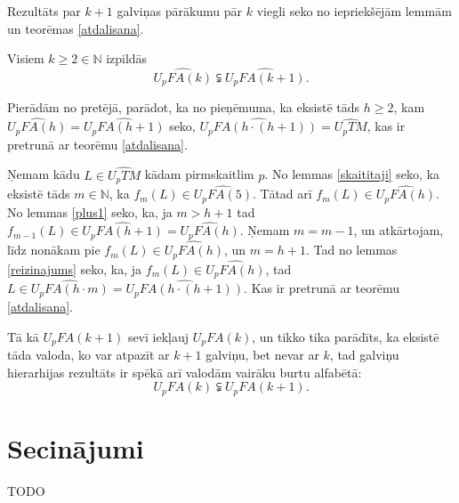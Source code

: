 \documentclass{ludis}
\begin{document}
Rezultāts par $k + 1$ galviņas pārākumu pār $k$ viegli seko no iepriekšējām lemmām un teorēmas \ref{atdalisana}.
\begin{teorema}
Visiem $k \geq 2 \in \mathbb{N}$ izpildās
\[
	\widehat{U_pFA(k)} \subsetneqq \widehat{U_pFA(k + 1)}.
\]
\end{teorema}
\begin{pieradijums}
Pierādām no pretējā, parādot, ka no pieņēmuma, ka eksistē tāds $h \geq 2$, kam $\widehat{U_pFA(h)} = \widehat{U_pFA(h + 1)}$ seko, $\widehat{U_pFA(h \cdot (h + 1))} = \widehat{U_pTM}$, kas ir pretrunā ar teorēmu \ref{atdalisana}.

Ņemam kādu $L \in \widehat{U_pTM}$ kādam pirmskaitlim $p$. No lemmas \ref{skaititaji} seko, ka eksistē tāds $m \in \mathbb{N}$, ka $f_m(L) \in \widehat{U_pFA(5)}$. Tātad arī $f_m(L) \in \widehat{U_pFA(h)}$. No lemmas \ref{plus1} seko, ka, ja $m > h + 1$ tad $f_{m-1}(L) \in \widehat{U_pFA(h + 1)} = \widehat{U_pFA(h)}$. Ņemam $m = m - 1$, un atkārtojam, līdz nonākam pie $f_m(L) \in \widehat{U_pFA(h)}$, un $m = h + 1$. Tad no lemmas \ref{reizinajums} seko, ka, ja $f_m(L) \in \widehat{U_pFA(h)}$, tad $L \in \widehat{U_pFA(h \cdot m)} = \widehat{U_pFA(h \cdot (h + 1))}$. Kas ir pretrunā ar teorēmu \ref{atdalisana}.
\end{pieradijums}
\begin{sekas}
Tā kā $U_pFA(k + 1)$ sevī iekļauj $U_pFA(k)$, un tikko tika parādīts, ka eksistē tāda valoda, ko var atpazīt ar $k+1$ galviņu, bet nevar ar $k$, tad galviņu hierarhijas rezultāts ir spēkā arī valodām vairāku burtu alfabētā:
\[
	U_pFA(k) \subsetneqq U_pFA(k + 1).
\]
\end{sekas}

\chapter{Secinājumi}
TODO

\printbibliography
\end{document}
